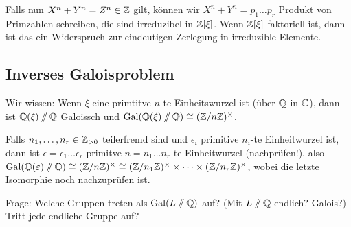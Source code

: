 \documentclass[12pt,a4paper]{scrartcl}
\begin{document}
Falls nun $X^n+Y^n = Z^n\in\mathbb Z$ gilt, können wir $X^n+Y^n = p_1\dots p_r$ Produkt von Primzahlen schreiben, die sind irreduzibel in $\mathbb Z[\xi]$. Wenn $\mathbb Z[\xi]$ faktoriell ist, dann ist das ein Widerspruch zur eindeutigen Zerlegung in irreduzible Elemente.

\subsection{Inverses Galoisproblem}
Wir wissen: Wenn $\xi$ eine primtitve $n$-te Einheitswurzel ist (über $\mathbb Q$ in $\mathbb C$), dann ist $\mathbb Q(\xi)\sslash \mathbb Q$ Galoissch und $\operatorname{Gal}(\mathbb Q(\xi)\sslash\mathbb Q)\cong (\mathbb Z/n\mathbb Z)^{\times}$.

Falls $n_1,\dots, n_r\in\mathbb Z_{>0}$ teilerfremd sind und $\epsilon_i$ primitive $n_i$-te Einheitwurzel ist, dann ist $\epsilon = \epsilon_1\dots\epsilon_r$ primitve $n = n_1\dots n_r$-te Einheitwurzel (nachprüfen!), also $\operatorname{Gal}(\mathbb Q(\varepsilon)\sslash \mathbb Q)\cong (\mathbb Z/n\mathbb Z)^{\times}\cong (\mathbb Z/n_1\mathbb Z)^{\times}\times\dots\times(\mathbb Z/n_r\mathbb Z)^{\times}$, wobei die letzte Isomorphie noch nachzuprüfen ist.

Frage: Welche Gruppen treten als $\operatorname{Gal}(L\sslash \mathbb Q)$ auf? (Mit $L\sslash \mathbb Q$ endlich? Galois?) Tritt jede endliche Gruppe auf?
\end{document}
